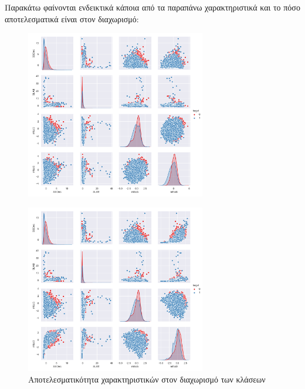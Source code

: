 \par Παρακάτω φαίνονται ενδεικτικά κάποια από τα παραπάνω χαρακτηριστικά και το πόσο αποτελεσματικά είναι στον διαχωρισμό:

\begin{figure}[H]
\centering
\includegraphics[width=0.7\textwidth]{res/figure_1.png}
\end{figure}
\begin{figure}[h]
\centering
\includegraphics[width=0.7\textwidth]{res/figure_2.png}
\caption{Αποτελεσματικότητα χαρακτηριστικών στον διαχωρισμό των κλάσεων}
\end{figure}



